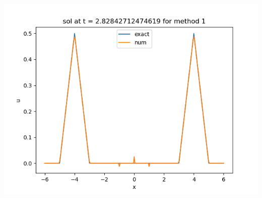 \documentclass{article}
\begin{document}
\begin{enumerate}
\begin{enumerate}
\begin{center}
		\includegraphics[scale=.32]{hw11 sol n = 80 method 1}
	\end{center}
	

\end{enumerate}
\end{enumerate}
\end{document}
